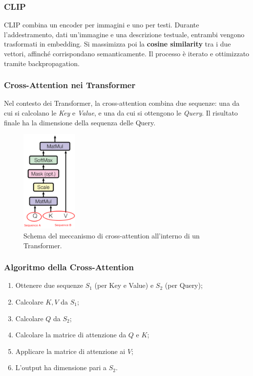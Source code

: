 \subsubsection{CLIP}

CLIP combina un encoder per immagini e uno per testi. Durante l’addestramento, dati un’immagine e una descrizione testuale, entrambi vengono trasformati in embedding. Si massimizza poi la \textbf{cosine similarity} tra i due vettori, affinché corrispondano semanticamente. Il processo è iterato e ottimizzato tramite backpropagation.

\subsubsection{Cross-Attention nei Transformer}

Nel contesto dei Transformer, la cross-attention combina due sequenze: una da cui si calcolano le \textit{Key} e \textit{Value}, e una da cui si ottengono le \textit{Query}. Il risultato finale ha la dimensione della sequenza delle Query.
\begin{figure}
    \centering
    \includegraphics[width=0.25\textwidth]{figure/CrossTrasformer.png}
    \caption{Schema del meccanismo di cross-attention all'interno di un Transformer.}
    \label{fig:crossTrasf}
\end{figure}

\subsubsection{Algoritmo della Cross-Attention}

\begin{enumerate}
    \item Ottenere due sequenze $S_1$ (per Key e Value) e $S_2$ (per Query);
    \item Calcolare $K, V$ da $S_1$;
    \item Calcolare $Q$ da $S_2$;
    \item Calcolare la matrice di attenzione da $Q$ e $K$;
    \item Applicare la matrice di attenzione ai $V$;
    \item L’output ha dimensione pari a $S_2$.
\end{enumerate}

